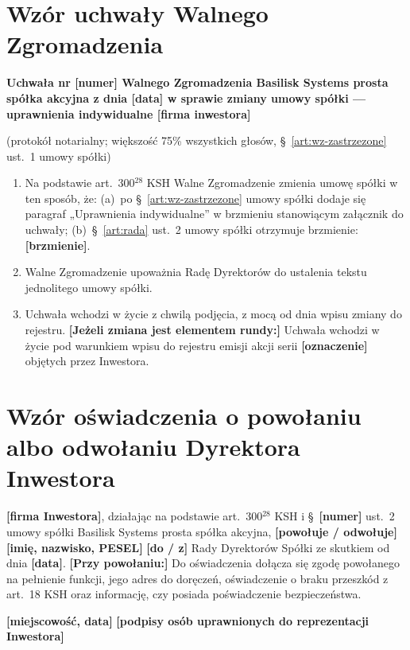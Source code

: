 \documentclass[11pt,a4paper]{report}
\newcounter{paragraf}
\newcommand{\field}[1]{\textbf{[#1]}}
\newcommand{\CompanyFull}{Basilisk Systems prosta spółka akcyjna}
\newcommand{\US}[1]{§~#1 umowy spółki}
\begin{document}
\section*{Wzór uchwały Walnego Zgromadzenia}

\textbf{Uchwała nr \field{numer} Walnego Zgromadzenia \CompanyFull{} z dnia \field{data} w sprawie zmiany umowy spółki --- uprawnienia indywidualne \field{firma inwestora}}

{\small (protokół notarialny; większość 75\% wszystkich głosów, \US{\ref{art:wz-zastrzezone} ust.~1})\par}

\begin{enumerate}
  \item Na podstawie art.~300$^{28}$ KSH Walne Zgromadzenie zmienia umowę spółki w ten sposób, że: (a)~po \US{\ref{art:wz-zastrzezone}} dodaje się paragraf „Uprawnienia indywidualne” w brzmieniu stanowiącym załącznik do uchwały; (b)~\US{\ref{art:rada} ust.~2} otrzymuje brzmienie: \field{brzmienie}.
  \item Walne Zgromadzenie upoważnia Radę Dyrektorów do ustalenia tekstu jednolitego umowy spółki.
  \item Uchwała wchodzi w życie z chwilą podjęcia, z mocą od dnia wpisu zmiany do rejestru. \field{Jeżeli zmiana jest elementem rundy:} Uchwała wchodzi w życie pod warunkiem wpisu do rejestru emisji akcji serii \field{oznaczenie} objętych przez Inwestora.
\end{enumerate}

\section*{Wzór oświadczenia o powołaniu albo odwołaniu Dyrektora Inwestora}

\field{firma Inwestora}, działając na podstawie art.~300$^{28}$ KSH i §~\field{numer} ust.~2 umowy spółki \CompanyFull{}, \field{powołuje / odwołuje} \field{imię, nazwisko, PESEL} \field{do / z} Rady Dyrektorów Spółki ze skutkiem od dnia \field{data}. \field{Przy powołaniu:} Do oświadczenia dołącza się zgodę powołanego na pełnienie funkcji, jego adres do doręczeń, oświadczenie o braku przeszkód z art.~18 KSH oraz informację, czy posiada poświadczenie bezpieczeństwa.

\field{miejscowość, data} \hfill \field{podpisy osób uprawnionych do reprezentacji Inwestora}
\end{document}
